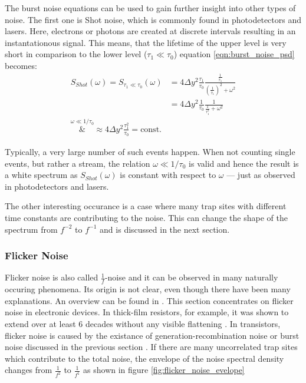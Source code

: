 The burst noise equations can be used to gain further insight into other types of noise. The first one is Shot noise, which is commonly found in photodetectors and lasers. Here, electrons or photons are created at discrete intervals resulting in an instantationous signal. This means, that the lifetime of the upper level is very short in comparison to the lower level ($\tau_1 \ll \tau_0$) equation \ref{eqn:burst_noise_psd} becomes:
\begin{align}
    S_{Shot}(\omega) = S_{\tau_1 \ll \tau_0}(\omega) &= 4 \Delta y^2 \frac{\tau_1}{\tau_0} \frac{\frac{1}{\bar \tau_1}}{\left(\frac{1}{\bar \tau_1}\right)^2 + \omega^2}\nonumber\\
    &= 4 \Delta y^2 \frac{1}{\tau_0} \frac{1}{\frac{1}{\tau_1^2}+\omega^2}\\
    \overset{\omega \ll 1/\tau_0}&{\approx} 4 \Delta y^2 \frac{\tau_1^2}{\tau_0} = \text{const.}
\end{align}

Typically, a very large number of such events happen. When not counting single events, but rather a stream, the relation $\omega \ll 1/\tau_0$ is valid and hence the result is a white spectrum as $S_{Shot}(\omega)$ is constant with respect to $\omega$ --- just as observed in photodetectors and lasers.

The other interesting occurance is a case where many trap sites with different time constants are contributing to the noise. This can change the shape of the spectrum from $f^{-2}$ to $f^{-1}$ and is discussed in the next section.

\clearpage
\subsubsection{Flicker Noise}%
\label{sec:flicker_noise}
Flicker noise is also called $\frac 1 f$-noise and it can be observed in many naturally occuring phenomena. Its origin is not clear, even though there have been many explanations. An overview can be found in \cite{flicker_noise_overview, flicker_noise_overview2, origins_1_f_noise}. This section concentrates on flicker noise in electronic devices. In thick-film resistors, for example, it was shown to extend over at least 6 decades without any visible flattening \cite{1_f_noise_thick_film}. In transistors, flicker noise is caused by the existance of generation-recombination noise or burst noise discussed in the previous section \cite{origins_1_f_noise}. If there are many uncorrelated trap sites which contribute to the total noise, the envelope of the noise spectral density changes from $\frac{1}{f^2}$ to $\frac{1}{f^1}$ as shown in figure \ref{fig:flicker_noise_evelope}

